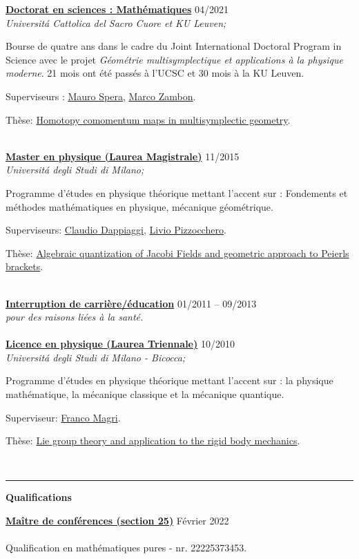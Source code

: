 \documentclass[a4paper]{article}
\newcommand{\block}[1]{\hrule \vspace{0.2cm} \textbf{\Large #1} \vspace{0.2cm}}
\newcommand{\voice}[5]{\href{#4}{\textbf{#1}} \hfill #2 \\ \textit{#3} \\ {\small #5} \vspace{0.2cm} \\}
\begin{document}
\begin{minipage}[t]{0.6\columnwidth}
    
    \voice{Doctorat en sciences : Mathématiques}
        {04/2021}
        {Universit\'a Cattolica del Sacro Cuore et KU Leuven;}
        {https://web.archive.org/save/http://scuoledidottorato.unicatt.it/phdschools/science-research-projects}       
        {Bourse de quatre ans dans le cadre du Joint International Doctoral Program in Science avec le projet \emph{Géométrie multisymplectique et applications à la physique moderne}. 21 mois ont été passés à l'UCSC et 30 mois à la KU Leuven.
 \par Superviseurs : \href{http://docenti.unicatt.it/ita/mauro_spera/}{Mauro Spera}, \href{https://perswww.kuleuven.be/~u0096206/}{Marco Zambon}. \par Thèse: \href{https://limo.libis.be/primo-explore/fulldisplay?docid=LIRIAS3408626&context=L&vid=KULeuven&search_scope=ALL_CONTENT&tab=all_content_tab&lang=en_US}{Homotopy comomentum maps in multisymplectic geometry}. }
    \voice{Master en physique (Laurea Magistrale)}
        {11/2015}
        {Universit\'a degli Studi di Milano;}
        {https://fisica-lm.cdl.unimi.it/it}       
        {Programme d'études en physique théorique mettant l'accent sur : Fondements et méthodes mathématiques en physique, mécanique géométrique. \par Superviseurs: \href{http://fisica.unipv.it/personale/Persona.php?ID=256}{Claudio Dappiaggi}, \href{http://users.mat.unimi.it/users/pizzocchero/}{Livio Pizzocchero}. \par Thèse: \href{https://www.researchgate.net/publication/295548746_Algebraic_quantization_of_Jacobi_fields_and_geometric_approach_to_Peierls_brackets}{Algebraic quantization of Jacobi Fields and geometric approach to Peierls brackets}. }
    \voice{Interruption de carrière/éducation}
        {01/2011 -- 09/2013}
        {pour des raisons liées à la santé.}
        {}       
        {\vspace{-0.25cm}}
    \voice{Licence en physique (Laurea Triennale)}
        {10/2010}
        {Universit\'a degli Studi di Milano - Bicocca;}
        {https://www.fisica.unimib.it/en}       
        {Programme d'études en physique théorique mettant l'accent sur : la physique mathématique, la mécanique classique et la mécanique quantique. \par Superviseur: \href{http://staff.matapp.unimib.it/~/magri/}{Franco Magri}. \par Thèse: \href{https://github.com/MasterToninus/TesiTriennale/blob/master/tesi.pdf}{Lie group theory and application to the rigid body mechanics}. }

        




    \block{Qualifications}

    
    \voice{Maître de conférences (section 25)}
        {Février 2022}
        {\vspace{-0.5cm}}
        {https://www.galaxie.enseignementsup-recherche.gouv.fr/ensup/qualification/Resultats_2022/qualifies_MCF_2022.pdf}       
        {Qualification en mathématiques pures - nr. 22225373453.}

        



\end{minipage} 
\end{document}
